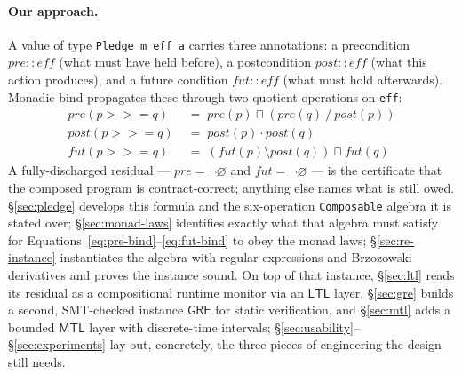 \documentclass[acmsmall,screen]{acmart}
\newcommand{\GRE}{\mathsf{GRE}}
\newcommand{\LTL}{\mathsf{LTL}}
\newcommand{\MTL}{\mathsf{MTL}}
\newcommand{\pre}{\mathit{pre}}
\newcommand{\post}{\mathit{post}}
\newcommand{\fut}{\mathit{fut}}
\newcommand{\univ}{\neg\varnothing}
\newcommand{\lquot}{\mathbin{\setminus}}   %
\newcommand{\rquot}{\mathbin{/}}           %
\begin{document}
\paragraph{Our approach.}
A value of type \lstinline{Pledge m eff a} carries three annotations:
a precondition $\pre :: \mathit{eff}$ (what must have held before),
a postcondition $\post :: \mathit{eff}$ (what this action produces), and
a future condition $\fut :: \mathit{eff}$ (what must hold afterwards).
Monadic bind propagates these through two quotient operations on
\lstinline{eff}:
\begin{align}
  \pre(p \mathbin{>\!\!>\!\!=} q)  &\;=\; \pre(p) \sqcap (\pre(q) \rquot \post(p))
  \label{eq:pre-bind}  \\
  \post(p \mathbin{>\!\!>\!\!=} q) &\;=\; \post(p) \cdot \post(q)
  \label{eq:post-bind} \\
  \fut(p \mathbin{>\!\!>\!\!=} q)  &\;=\; (\fut(p) \lquot \post(q)) \sqcap \fut(q)
  \label{eq:fut-bind}
\end{align}
A fully-discharged residual --- $\pre = \univ$ and $\fut = \univ$ --- is the
certificate that the composed program is contract-correct;
anything else names what is still owed.
\S\ref{sec:pledge} develops this formula and the six-operation
\lstinline{Composable} algebra it is stated over; \S\ref{sec:monad-laws}
identifies exactly what that algebra must satisfy for
Equations~\eqref{eq:pre-bind}--\eqref{eq:fut-bind} to obey the monad laws;
\S\ref{sec:re-instance} instantiates the algebra with regular expressions
and Brzozowski derivatives and proves the instance sound.
On top of that instance, \S\ref{sec:ltl} reads its residual as a
compositional runtime monitor via an $\LTL$ layer, \S\ref{sec:gre} builds
a second, SMT-checked instance $\GRE$ for static verification, and
\S\ref{sec:mtl} adds a bounded $\MTL$ layer with discrete-time intervals;
\S\ref{sec:usability}--\S\ref{sec:experiments} lay out, concretely, the
three pieces of engineering the design still needs.
\end{document}
